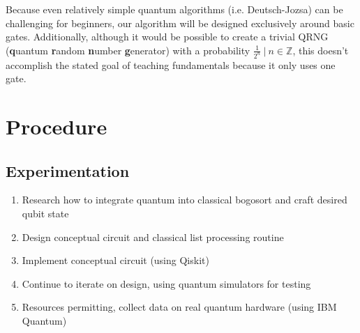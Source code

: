 \documentclass[12pt]{article}
\begin{document}
Because even relatively simple quantum algorithms (i.e. Deutsch-Jozsa) can be challenging for beginners, our algorithm will be designed exclusively around basic gates.
Additionally, although it would be possible to create a trivial QRNG (\textbf{q}uantum \textbf{r}andom \textbf{n}umber \textbf{g}enerator) with a probability $\frac{1}{2^{n}} \ | \ n \in \mathbb{Z}$, this doesn't accomplish the stated goal of teaching fundamentals because it only uses one gate.


\section{Procedure}



\subsection{Experimentation}
\begin{enumerate}
    \item Research how to integrate quantum into classical bogosort and craft desired qubit state
    \item Design conceptual circuit and classical list processing routine
    \item Implement conceptual circuit (using Qiskit)
    \item Continue to iterate on design, using quantum simulators for testing
    \item Resources permitting, collect data on real quantum hardware (using IBM Quantum)
\end{enumerate}
\end{document}
